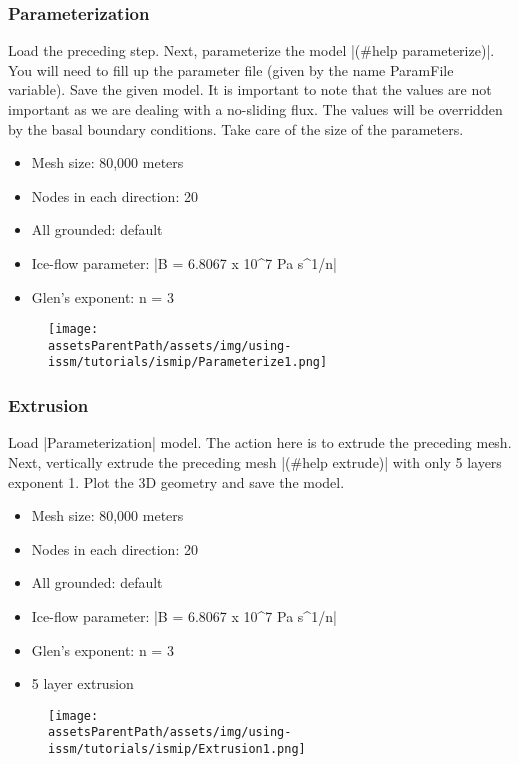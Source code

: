 \subsubsection{Parameterization} %
Load the preceding step. Next, parameterize the model \lstinlinebg|(#help parameterize)|. You will need to fill up the parameter file (given by the name ParamFile variable). Save the given model. It is important to note that the values are not important as we are dealing with a no-sliding flux. The values will be overridden by the basal boundary conditions. Take care of the size of the parameters.
\begin{itemize}
	\item Mesh size: 80,000 meters
	\item Nodes in each direction: 20
	\item All grounded: default
	\item Ice-flow parameter: \lstinlinebg|B = 6.8067 x 10^7 Pa s^1/n|
	\item Glen's exponent: n = 3
\end{itemize}
\begin{figure}[H]
	\begin{center}
		\texttt{[image: \\assetsParentPath/assets/img/using-issm/tutorials/ismip/Parameterize1.png]}
	\end{center}
\end{figure}
\subsubsection{Extrusion} %
Load \lstinlinebg|Parameterization| model. The action here is to extrude the preceding mesh. Next, vertically extrude the preceding mesh \lstinlinebg|(#help extrude)| with only 5 layers exponent 1. Plot the 3D geometry and save the model.
\begin{itemize}
	\item Mesh size: 80,000 meters
	\item Nodes in each direction: 20
	\item All grounded: default
	\item Ice-flow parameter: \lstinlinebg|B = 6.8067 x 10^7 Pa s^1/n|
	\item Glen's exponent: n = 3
	\item 5 layer extrusion
\end{itemize}
\begin{figure}[H]
	\begin{center}
		\texttt{[image: \\assetsParentPath/assets/img/using-issm/tutorials/ismip/Extrusion1.png]}
	\end{center}
\end{figure}
